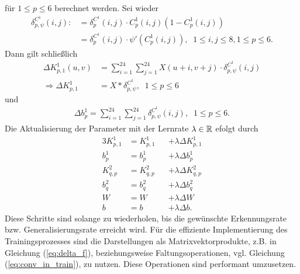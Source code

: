 für $1 \leq p \leq 6$ berechnet werden. Sei wieder
\begin{align*}
    \delta^{C^1}_{p,\psi}(i,j):&= \delta^{C^1}_p(i,j) \cdot C_p^1(i,j)\left(1- C_p^1(i,j)\right)\\
    &= \delta^{C^1}_p(i,j) \cdot \psi'(C^1_p(i,j)), \; \; 1 \leq i,j \leq 8, 1 \leq p \leq 6.
\end{align*}
Dann gilt schließlich
\begin{align*}
    \Delta K^1_{p,1}(u,v) &= \sum_{i=1}^{24} \sum_{j=1}^{24} X(u+i,v+j) \cdot \delta^{C^1}_{p,\psi}(i,j) \\
     \Rightarrow \Delta K_{p,1}^1 &=  X \ast \delta^{C^1}_{p,\psi} , \; \; 1 \leq p \leq 6
\end{align*} und 
\begin{align*}
    \Delta b_p^1 = \sum_{i=1}^{24} \sum_{j=1}^{24} \delta_{p, \psi}^{C^1}(i,j), \; \; 1 \leq p \leq 6.
\end{align*}
Die Aktualisierung der Parameter mit der Lernrate $\lambda \in \mathbb{R}$ efolgt durch
\begin{alignat*}{3}
    K^{1}_{p,1}&=K^{1}_{p,1} &&+ \lambda \Delta K^1_{p,1} \\
    b^{1}_{p}&=b^{1}_{p} &&+ \lambda \Delta b^1_{p} \\
    K^{2}_{q,p}&=K^{2}_{q,p} &&+ \lambda \Delta K^2_{q,p} \\
    b^{2}_{q}&=b^{2}_{q} &&+ \lambda \Delta b^2_{q} \\
    W&=W &&+ \lambda \Delta W \\
    b&=b&&+ \lambda \Delta b.
\end{alignat*}
Diese Schritte sind solange zu wiederholen, bis die gewünschte Erkennungsrate bzw. Generalisierungsrate erreicht wird. Für die effiziente Implementierung des Trainingsprozesses sind die Darstellungen als Matrixvektorprodukte, z.B. in Gleichung (\ref{eq:delta_f}), beziehungsweise Faltungsoperationen, vgl. Gleichung (\ref{eq:conv_in_train}), zu nutzen. Diese Operationen sind performant umzusetzen.

